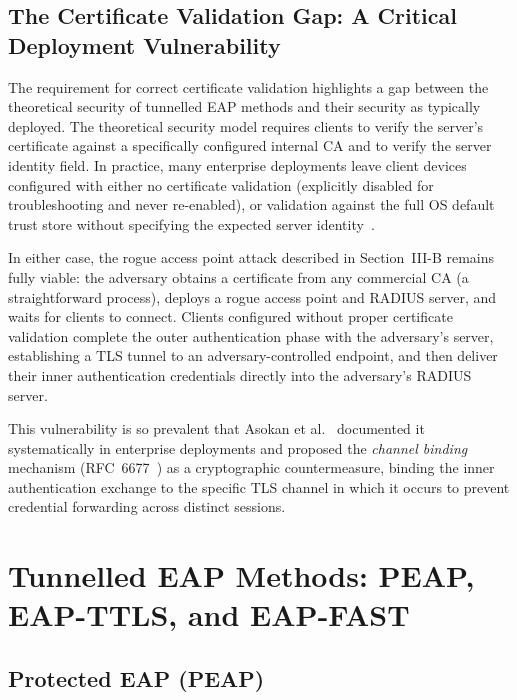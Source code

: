 \documentclass[journal]{IEEEtran}
\begin{document}
\subsection{The Certificate Validation Gap: A Critical Deployment Vulnerability}

The requirement for correct certificate validation highlights a gap between the
theoretical security of tunnelled EAP methods and their security as typically
deployed. The theoretical security model requires clients to verify the server's
certificate against a specifically configured internal CA and to verify the server
identity field. In practice, many enterprise deployments leave client devices
configured with either no certificate validation (explicitly disabled for
troubleshooting and never re-enabled), or validation against the full OS default
trust store without specifying the expected server identity~\cite{asokan2013}.

In either case, the rogue access point attack described in Section~III-B remains
fully viable: the adversary obtains a certificate from any commercial CA (a
straightforward process), deploys a rogue access point and RADIUS server, and
waits for clients to connect. Clients configured without proper certificate
validation complete the outer authentication phase with the adversary's server,
establishing a TLS tunnel to an adversary-controlled endpoint, and then
deliver their inner authentication credentials directly into the adversary's
RADIUS server.

This vulnerability is so prevalent that Asokan et al.~\cite{asokan2013} documented
it systematically in enterprise deployments and proposed the \emph{channel binding}
mechanism (RFC~6677~\cite{rfc6677}) as a cryptographic countermeasure, binding the
inner authentication exchange to the specific TLS channel in which it occurs to
prevent credential forwarding across distinct sessions.

\section{Tunnelled EAP Methods: PEAP, EAP-TTLS, and EAP-FAST}

\subsection{Protected EAP (PEAP)}
\end{document}
